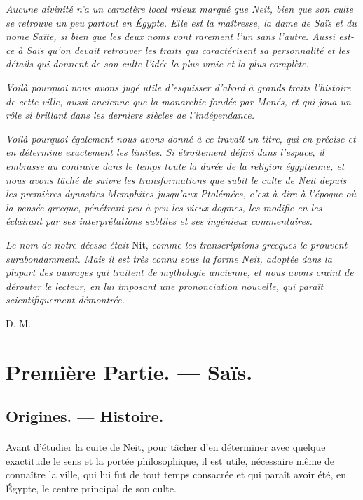 \documentclass[a4paper, 11pt, oneside]{article}
\begin{document}
\emph{Aucune divinité n'a un caractère local mieux marqué que Neit, bien que son culte se retrouve un peu partout en Égypte. Elle est la maîtresse, la dame de Saïs et du nome Saïte, si bien que les deux noms vont rarement l'un sans l'autre. Aussi est-ce à Saïs qu'on devait retrouver les traits qui caractérisent sa personnalité et les détails qui donnent de son culte l'idée la plus vraie et la plus complète.}

\emph{Voilà pourquoi nous avons jugé utile d'esquisser d'abord à grands traits l'histoire de cette ville, aussi ancienne que la monarchie fondée par Menés, et qui joua un rôle si brillant dans les derniers siècles de l'indépendance.}

\emph{Voilà pourquoi également nous avons donné à ce travail un titre, qui en précise et en détermine exactement les limites. Si étroitement défini dans l'espace, il embrasse au contraire dans le temps toute la durée de la religion égyptienne, et nous avons tâché de suivre les transformations que subit le culte de Neit depuis les premières dynasties Memphites jusqu'aux Ptolémées, c'est-à-dire à l'époque où la pensée grecque, pénétrant peu à peu les vieux dogmes, les modifie en les éclairant par ses interprétations subtiles et ses ingénieux commentaires.}

\emph{Le nom de notre déesse était} Nit, \emph{comme les transcriptions grecques le prouvent surabondamment. Mais il est très connu sous la forme Neit, adoptée dans la plupart des ouvrages qui traitent de mythologie ancienne, et nous avons craint de dérouter le lecteur, en lui imposant une prononciation nouvelle, qui paraît scientifiquement démontrée.}

D. M.
\clearpage
\section{Première Partie. --- Saïs.}
\subsection{Origines. --- Histoire.}
\paragraph{}
Avant d'étudier la cuite de Neit, pour tâcher d'en déterminer avec quelque exactitude le sens et la portée philosophique, il est utile, nécessaire même de connaître la ville, qui lui fut de tout temps consacrée et qui paraît avoir été, en Égypte, le centre principal de son culte.
\end{document}

